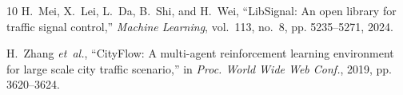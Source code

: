\documentclass[letterpaper,journal]{IEEEtran}
\begin{document}
\begin{thebibliography}{10}
H.~Mei, X.~Lei, L.~Da, B.~Shi, and H.~Wei, ``{LibSignal}: An open library for traffic signal control,'' \emph{Machine Learning}, vol.~113, no.~8, pp. 5235--5271, 2024.

H.~Zhang \emph{et~al.}, ``{CityFlow}: A multi-agent reinforcement learning environment for large scale city traffic scenario,'' in \emph{Proc. World Wide Web Conf.}, 2019, pp. 3620--3624.

\end{thebibliography}
\end{document}

